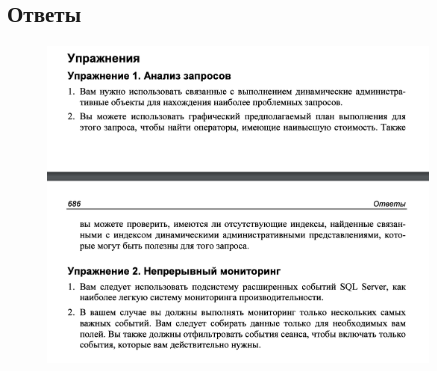 \subsection*{Ответы}

\begin{figure}[h!]
	\begin{center}
		\includegraphics[width=0.9\textwidth]{img/eans18.png}
	\end{center}
	\captionsetup{justification=centering}
\end{figure}